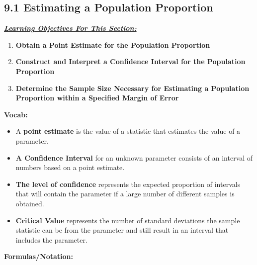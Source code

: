 \documentclass{report}
\begin{document}
    \subsection{9.1 Estimating a Population Proportion}
    \bigbreak \noindent \bigbreak \noindent  
    \textbf{\textit{\underline{Learning Objectives For This Section:}}}
    \begin{enumerate}
        \item \textbf{Obtain a Point Estimate for the Population Proportion}
        \item \textbf{Construct and Interpret a Confidence Interval for the Population Proportion}
        \item \textbf{Determine the Sample Size Necessary for Estimating a Population Proportion within a Specified Margin of Error}
    \end{enumerate}
    \bigbreak \noindent \bigbreak \noindent 
    \textbf{Vocab:}
    \begin{itemize}
        \item A \textbf{point estimate} is the value of a statistic that estimates the value of a parameter.
        \item \textbf{A Confidence Interval} for an  unknown parameter consists of an interval of numbers based on a point estimate.
        \item \textbf{The level of confidence} represents the expected proportion of intervals that will contain the parameter if a large number of different samples is obtained.
        \item \textbf{Critical Value} represents the number of standard deviations the sample statistic can be from the parameter and still result in an interval that includes the parameter.
    \end{itemize}
    \bigbreak \noindent \bigbreak \noindent 
    \textbf{Formulas/Notation:}
\end{document}
